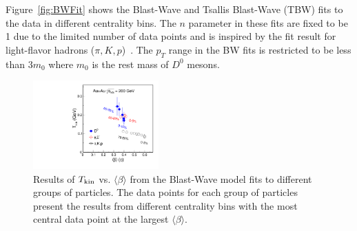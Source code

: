 \documentclass[%
 reprint,	
 amsmath,amssymb,
 aps,
 prc,
]{revtex4-1}
\begin{document}
%

Figure~\ref{fig:BWFit} shows the Blast-Wave and Tsallis Blast-Wave (TBW) fits to the data in different centrality bins. The $n$ parameter in these fits are fixed to be 1 due to the limited number of data points and is inspired by the fit result for light-flavor hadrons ($\pi,K,p$)~\cite{Tang:2008ud}. The $p_{T}$ range in the BW fits is restricted to be less than 3$m_{0}$ where $m_{0}$ is the rest mass of $D^0$ mesons.

\begin{figure}
\centering
\includegraphics[width=0.43\textwidth]{fig/TvsBeta.pdf}
\caption{Results of $T_{\rm kin}$ vs. $\langle\beta\rangle$ from the Blast-Wave model fits to different groups of particles. The data points for each group of particles present the results from different centrality bins with the most central data point at the largest $\langle\beta\rangle$.}
\label{fig:BWFitSummary} 
\end{figure}
\end{document}
